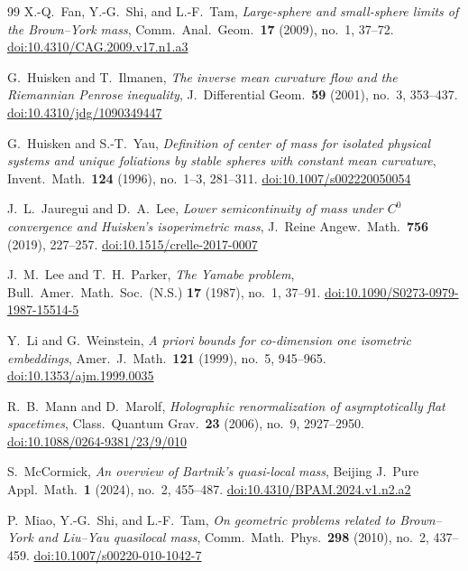 \documentclass[10pt]{amsart}
\theoremstyle{plain}
\theoremstyle{remark}
\begin{document}
\begin{thebibliography}{99}
		X.-Q.~Fan, Y.-G.~Shi, and L.-F.~Tam,
		\emph{Large-sphere and small-sphere limits of the Brown--York mass},
		Comm.\ Anal.\ Geom.\ \textbf{17} (2009), no.~1, 37--72.
		\href{https://doi.org/10.4310/CAG.2009.v17.n1.a3}{doi:10.4310/CAG.2009.v17.n1.a3}
		
		G.~Huisken and T.~Ilmanen,
		\emph{The inverse mean curvature flow and the Riemannian Penrose inequality},
		J.\ Differential Geom.\ \textbf{59} (2001), no.~3, 353--437.
		\href{https://doi.org/10.4310/jdg/1090349447}{doi:10.4310/jdg/1090349447}
		
		G.~Huisken and S.-T.~Yau,
		\emph{Definition of center of mass for isolated physical systems and unique foliations by stable spheres with constant mean curvature},
		Invent.\ Math.\ \textbf{124} (1996), no.~1--3, 281--311.
		\href{https://doi.org/10.1007/s002220050054}{doi:10.1007/s002220050054}
		
		J.~L.~Jauregui and D.~A.~Lee,
		\emph{Lower semicontinuity of mass under $C^0$ convergence and Huisken's isoperimetric mass},
		J.\ Reine Angew.\ Math.\ \textbf{756} (2019), 227--257.
		\href{https://doi.org/10.1515/crelle-2017-0007}{doi:10.1515/crelle-2017-0007}
		
		J.~M.~Lee and T.~H.~Parker,
		\emph{The Yamabe problem},
		Bull.\ Amer.\ Math.\ Soc.\ (N.S.) \textbf{17} (1987), no.~1, 37--91.
		\href{https://doi.org/10.1090/S0273-0979-1987-15514-5}{doi:10.1090/S0273-0979-1987-15514-5}
		
		Y.~Li and G.~Weinstein,
		\emph{A priori bounds for co-dimension one isometric embeddings},
		Amer.\ J.\ Math.\ \textbf{121} (1999), no.~5, 945--965.
		\href{https://doi.org/10.1353/ajm.1999.0035}{doi:10.1353/ajm.1999.0035}
		
		R.~B.~Mann and D.~Marolf,
		\emph{Holographic renormalization of asymptotically flat spacetimes},
		Class.\ Quantum Grav.\ \textbf{23} (2006), no.~9, 2927--2950.
		\href{https://doi.org/10.1088/0264-9381/23/9/010}{doi:10.1088/0264-9381/23/9/010}
		
		S.~McCormick,
		\emph{An overview of Bartnik's quasi-local mass},
		Beijing J.\ Pure Appl.\ Math.\ \textbf{1} (2024), no.~2, 455--487.
		\href{https://doi.org/10.4310/BPAM.2024.v1.n2.a2}{doi:10.4310/BPAM.2024.v1.n2.a2}
		
		P.~Miao, Y.-G.~Shi, and L.-F.~Tam,
		\emph{On geometric problems related to Brown--York and Liu--Yau quasilocal mass},
		Comm.\ Math.\ Phys.\ \textbf{298} (2010), no.~2, 437--459.
		\href{https://doi.org/10.1007/s00220-010-1042-7}{doi:10.1007/s00220-010-1042-7}
		

\end{thebibliography}
\end{document}
